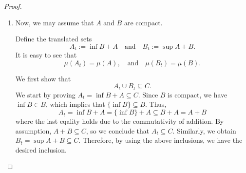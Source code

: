\begin{proof}
\begin{enumerate}
\begin{enumerate}
            Finally, we obtain
            \begin{equation}
                \mu(A_\epsilon) + \mu(B_\epsilon) \leq \mu(C)
                \label{eqn: BM for cpt}
            \end{equation}
            for non-empty measurable compact sets \(A_\epsilon\) and \(B_\epsilon\) with finite measure.

            Therefore, we conclude that 
            \begin{equation*}
                \mu(A) + \mu(B) < \mu(A_\epsilon) + \mu(B_\epsilon) + \epsilon \leq \mu(C) + \epsilon
            \end{equation*}
            where the first inequality holds from (\ref{eqn: volA bdd by Ae}) and (\ref{eqn: volB bdd by Be}) and the second follows from (\ref{eqn: BM for cpt}).
            Since this argument holds for any fixed \(\epsilon>0\), the proof is completed.

            \item Now, we may assume that \(A\) and \(B\) are compact.
            
            Define the translated sets 
            \begin{equation*}
                A_t := \inf B + A \quad \text{and} \quad B_t := \sup A + B.
            \end{equation*}
            It is easy to see that 
            \begin{equation*}
                \mu(A_t) = \mu(A), \quad \text{and} \quad \mu(B_t) = \mu(B).
            \end{equation*}

            We first show that 
            \begin{equation}
                A_t \cup B_t \subseteq C.
                \label{eqn: union At Bt included in C}
            \end{equation}
            We start by proving \(A_t = \inf B + A \subseteq C\). 
            Since \(B\) is compact, we have \(\inf B \in B\), which implies that \(\{\inf B\} \subseteq B\).
            Thus, 
            \begin{equation*}
                A_t = \inf B + A = \{\inf B\} + A \subseteq B + A = A + B
            \end{equation*}
            where the last eqality holds due to the commutativity of addition. 
            By assumption, \(A + B \subseteq C\), so we conclude that \(A_t \subseteq C\).
            Similarly, we obtain \(B_t = \sup A + B \subseteq C\).
            Therefore, by using the above inclusions, we have the desired inclusion.
            

\end{enumerate}
\end{enumerate}
\end{proof}
